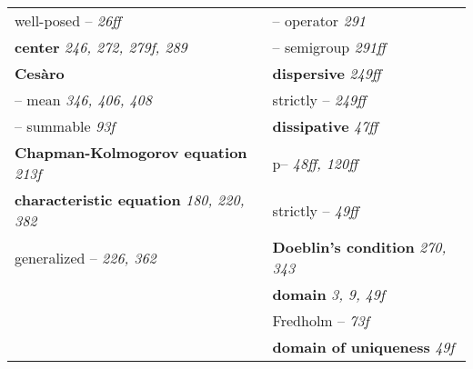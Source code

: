\documentclass{article}
\begin{document}
\begin{longtable}{p{}p{}}
\quad well-posed -- \textit{26ff} & \quad -- operator \textit{291} \\
\textbf{center} \textit{246, 272, 279f, 289} & \quad -- semigroup \textit{291ff} \\
\textbf{Cesàro} & \textbf{dispersive} \textit{249ff} \\
\quad -- mean \textit{346, 406, 408} & \quad strictly -- \textit{249ff} \\
\quad -- summable \textit{93f} & \textbf{dissipative} \textit{47ff} \\
\textbf{Chapman-Kolmogorov equation} \textit{213f} & \quad p-- \textit{48ff, 120ff} \\
\textbf{characteristic equation} \textit{180, 220, 382} & \quad strictly -- \textit{49ff} \\
\quad generalized -- \textit{226, 362} & \textbf{Doeblin's condition} \textit{270, 343} \\
& \textbf{domain} \textit{3, 9, 49f} \\
& \quad Fredholm -- \textit{73f} \\
& \textbf{domain of uniqueness} \textit{49f} \\


\end{longtable}
\end{document}
